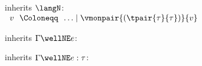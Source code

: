 \begin{flushleft}

 inherits $\langN$:\\
$\begin{array}{l@{~~}c@{~~}l}
  v & \Coloneqq & \ldots \mid \vmonpair{(\tpair{\tau}{\tau})}{v}
\end{array}$

\medskip
\begin{minipage}[t]{\columnwidth}
 inherits $\Gamma \wellNE e$:
\begin{mathpar}
\end{mathpar}
\end{minipage}%
\begin{minipage}[t]{\columnwidth}
 inherits $\Gamma \wellNE e : \tau$:
\begin{mathpar}
\end{mathpar}
\end{minipage}



\end{flushleft}
